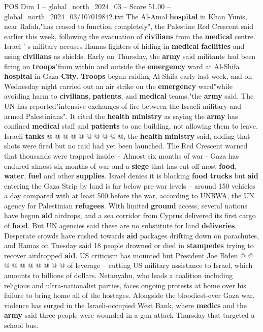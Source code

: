 \begin{textsample}{POS Dim 1 – global\_north\_2024\_03 – Score 51.00 – global\_north\_2024\_03/107019842.txt}
The Al-Amal \textbf{hospital} in Khan Yunis, near Rafah,"has ceased to function completely", the Palestine Red Crescent said earlier this week, following the evacuation of \textbf{civilians} from the \textbf{medical} centre.
Israel ' s military accuses Hamas fighters of hiding in \textbf{medical} \textbf{facilities} and using \textbf{civilians} as shields.
Early on Thursday, the \textbf{army} said militants had been firing on \textbf{troops}"from within and outside the \textbf{emergency} ward at Al-Shifa \textbf{hospital} in Gaza \textbf{City}. \textbf{Troops} began raiding Al-Shifa early last week, and on Wednesday night carried out an air strike on the \textbf{emergency} ward"while avoiding harm to \textbf{civilians}, \textbf{patients}, and \textbf{medical} teams,"the \textbf{army} said.
The UN has reported"intensive exchanges of fire between the Israeli military and armed Palestinians".
It cited the \textbf{health} \textbf{ministry} as saying the \textbf{army} has confined \textbf{medical} staff and \textbf{patients} to one building, not allowing them to leave.
Israeli \textbf{tanks} @ @ @ @ @ @ @ @ @ @, the \textbf{health} \textbf{ministry} said, adding that shots were fired but no raid had yet been launched.
The Red Crescent warned that thousands were trapped inside. - Almost six months of war - Gaza has endured almost six months of war and a \textbf{siege} that has cut off most \textbf{food}, \textbf{water}, \textbf{fuel} and other \textbf{supplies}.
Israel denies it is blocking \textbf{food} \textbf{trucks} but \textbf{aid} entering the Gaza Strip by land is far below pre-war levels -- around 150 vehicles a day compared with at least 500 before the war, according to UNRWA, the UN agency for Palestinian \textbf{refugees}.
With limited \textbf{ground} access, several nations have begun \textbf{aid} airdrops, and a sea corridor from Cyprus delivered its first cargo of \textbf{food}.
But UN agencies said these are no substitute for land \textbf{deliveries}.
Desperate crowds have rushed towards \textbf{aid} packages drifting down on parachutes, and Hamas on Tuesday said 18 people drowned or died in \textbf{stampedes} trying to recover airdropped \textbf{aid}.
US criticism has mounted but President Joe Biden @ @ @ @ @ @ @ @ @ @ of leverage -- cutting US military assistance to Israel, which amounts to billions of dollars.
Netanyahu, who leads a coalition including religious and ultra-nationalist parties, faces ongoing protests at home over his failure to bring home all of the hostages.
Alongside the bloodiest-ever Gaza war, violence has surged in the Israeli-occupied West Bank, where \textbf{medics} and the \textbf{army} said three people were wounded in a gun attack Thursday that targeted a school bus.

\end{textsample}
